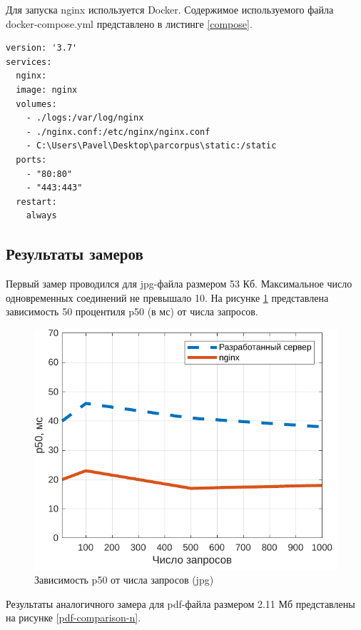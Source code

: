 Для запуска nginx используется Docker. Содержимое используемого файла docker-compose.yml представлено в листинге \ref{compose}.

\begin{lstlisting}[caption={Конфигурация docker-compose.yml}, label=compose]
version: '3.7'
services:  
  nginx:
  image: nginx
  volumes:
    - ./logs:/var/log/nginx
    - ./nginx.conf:/etc/nginx/nginx.conf
    - C:\Users\Pavel\Desktop\parcorpus\static:/static
  ports:
    - "80:80"
    - "443:443"
  restart:
    always
\end{lstlisting}

\subsection{Результаты замеров}

Первый замер проводился для jpg-файла размером 53 Кб. Максимальное число одновременных соединений не превышало 10. На рисунке \ref{jpg-comparison-n} представлена зависимость 50 процентиля p50 (в мс) от числа запросов.

\captionsetup{singlelinecheck = false, justification=centering}
\begin{figure}[H]
	\centering
	\includegraphics[scale=0.9]{img/jpg.pdf}
	\caption{Зависимость p50 от числа запросов (jpg)}
	\label{jpg-comparison-n}
\end{figure}

Результаты аналогичного замера для pdf-файла размером 2.11 Мб представлены на рисунке \ref{pdf-comparison-n}.

